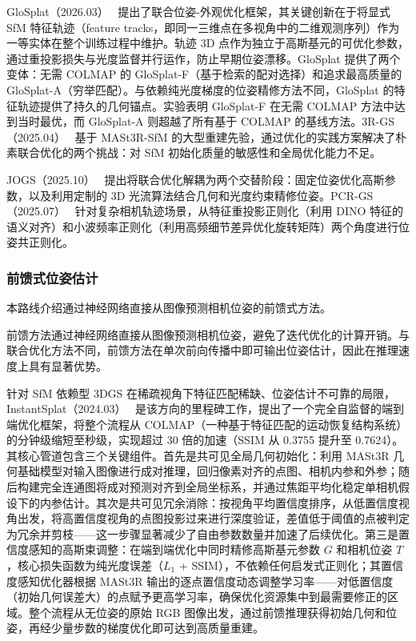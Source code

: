 GloSplat（2026.03）~\cite{2603_04847} 提出了联合位姿-外观优化框架，其关键创新在于将显式 SfM 特征轨迹（feature tracks，即同一三维点在多视角中的二维观测序列）作为一等实体在整个训练过程中维护。轨迹 3D 点作为独立于高斯基元的可优化参数，通过重投影损失与光度监督并行运作，防止早期位姿漂移。GloSplat 提供了两个变体：无需 COLMAP 的 GloSplat-F（基于检索的配对选择）和追求最高质量的 GloSplat-A（穷举匹配）。与依赖纯光度梯度的位姿精修方法不同，GloSplat 的特征轨迹提供了持久的几何锚点。实验表明 GloSplat-F 在无需 COLMAP 方法中达到当时最优，而 GloSplat-A 则超越了所有基于 COLMAP 的基线方法。3R-GS（2025.04）~\cite{2504_04294} 基于 MASt3R-SfM 的大型重建先验，通过优化的实践方案解决了朴素联合优化的两个挑战：对 SfM 初始化质量的敏感性和全局优化能力不足。

JOGS（2025.10）~\cite{2510_26117} 提出将联合优化解耦为两个交替阶段：固定位姿优化高斯参数，以及利用定制的 3D 光流算法结合几何和光度约束精修位姿。PCR-GS（2025.07）~\cite{2507_13891} 针对复杂相机轨迹场景，从特征重投影正则化（利用 DINO 特征的语义对齐）和小波频率正则化（利用高频细节差异优化旋转矩阵）两个角度进行位姿共正则化。

\subsubsection{前馈式位姿估计}

本路线介绍通过神经网络直接从图像预测相机位姿的前馈式方法。

前馈方法通过神经网络直接从图像预测相机位姿，避免了迭代优化的计算开销。与联合优化方法不同，前馈方法在单次前向传播中即可输出位姿估计，因此在推理速度上具有显著优势。

针对 SfM 依赖型 3DGS 在稀疏视角下特征匹配稀缺、位姿估计不可靠的局限，InstantSplat（2024.03）~\cite{2403_20309} 是该方向的里程碑工作，提出了一个完全自监督的端到端优化框架，将整个流程从 COLMAP（一种基于特征匹配的运动恢复结构系统）的分钟级缩短至秒级，实现超过 30 倍的加速（SSIM 从 0.3755 提升至 0.7624）。其核心管道包含三个关键组件。首先是共可见全局几何初始化：利用 MASt3R 几何基础模型对输入图像进行成对推理，回归像素对齐的点图、相机内参和外参；随后构建完全连通图将成对预测对齐到全局坐标系，并通过焦距平均化稳定单相机假设下的内参估计。其次是共可见冗余消除：按视角平均置信度排序，从低置信度视角出发，将高置信度视角的点图投影过来进行深度验证，差值低于阈值的点被判定为冗余并剪枝——这一步骤显著减少了自由参数数量并加速了后续优化。第三是置信度感知的高斯束调整：在端到端优化中同时精修高斯基元参数 $G$ 和相机位姿 $T$，核心损失函数为纯光度误差（$L_1$ + SSIM），不依赖任何启发式正则化；其置信度感知优化器根据 MASt3R 输出的逐点置信度动态调整学习率——对低置信度（初始几何误差大）的点赋予更高学习率，确保优化资源集中到最需要修正的区域。整个流程从无位姿的原始 RGB 图像出发，通过前馈推理获得初始几何和位姿，再经少量步数的梯度优化即可达到高质量重建。

